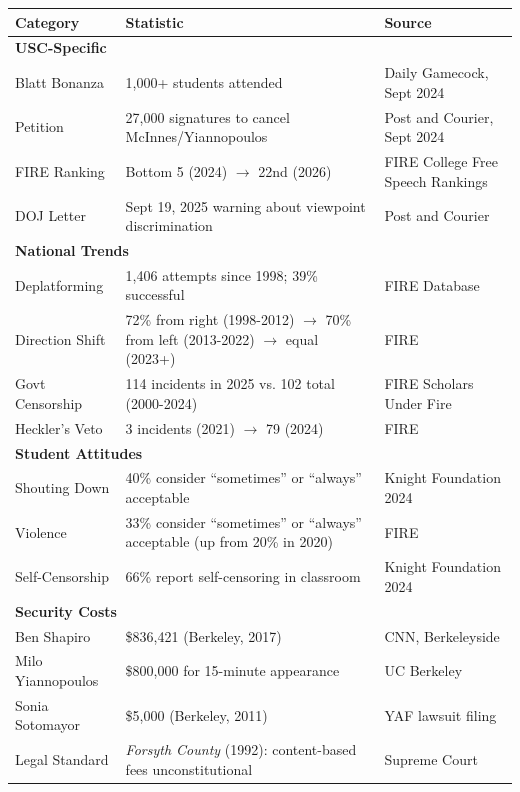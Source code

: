 \documentclass[11pt,letterpaper]{article}
\begin{document}
\begin{longtable}{p{3cm}p{4cm}p{6cm}}
\toprule
\textbf{Category} & \textbf{Statistic} & \textbf{Source} \\
\midrule
\endhead

\multicolumn{3}{l}{\textbf{USC-Specific}} \\
\midrule
Blatt Bonanza & 1,000+ students attended & Daily Gamecock, Sept 2024 \\
Petition & 27,000 signatures to cancel McInnes/Yiannopoulos & Post and Courier, Sept 2024 \\
FIRE Ranking & Bottom 5 (2024) $\rightarrow$ 22nd (2026) & FIRE College Free Speech Rankings \\
DOJ Letter & Sept 19, 2025 warning about viewpoint discrimination & Post and Courier \\
\midrule

\multicolumn{3}{l}{\textbf{National Trends}} \\
\midrule
Deplatforming & 1,406 attempts since 1998; 39\% successful & FIRE Database \\
Direction Shift & 72\% from right (1998-2012) $\rightarrow$ 70\% from left (2013-2022) $\rightarrow$ equal (2023+) & FIRE \\
Govt Censorship & 114 incidents in 2025 vs. 102 total (2000-2024) & FIRE Scholars Under Fire \\
Heckler's Veto & 3 incidents (2021) $\rightarrow$ 79 (2024) & FIRE \\
\midrule

\multicolumn{3}{l}{\textbf{Student Attitudes}} \\
\midrule
Shouting Down & 40\% consider ``sometimes'' or ``always'' acceptable & Knight Foundation 2024 \\
Violence & 33\% consider ``sometimes'' or ``always'' acceptable (up from 20\% in 2020) & FIRE \\
Self-Censorship & 66\% report self-censoring in classroom & Knight Foundation 2024 \\
\midrule

\multicolumn{3}{l}{\textbf{Security Costs}} \\
\midrule
Ben Shapiro & \$836,421 (Berkeley, 2017) & CNN, Berkeleyside \\
Milo Yiannopoulos & \$800,000 for 15-minute appearance & UC Berkeley \\
Sonia Sotomayor & \$5,000 (Berkeley, 2011) & YAF lawsuit filing \\
Legal Standard & \textit{Forsyth County} (1992): content-based fees unconstitutional & Supreme Court \\
\bottomrule
\end{longtable}
\end{document}
